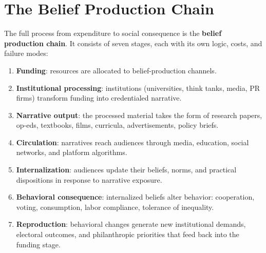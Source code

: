 \section{The Belief Production Chain}
\label{sec:ch1-chain}

The full process from expenditure to social consequence is the \textbf{belief production chain}.
It consists of seven stages, each with its own logic, costs, and failure modes:

\begin{enumerate}[nosep]
  \item \textbf{Funding}: resources are allocated to belief-production channels.
  \item \textbf{Institutional processing}: institutions (universities, think tanks, media, PR firms) transform funding into credentialed narrative.
  \item \textbf{Narrative output}: the processed material takes the form of research papers, op-eds, textbooks, films, curricula, advertisements, policy briefs.
  \item \textbf{Circulation}: narratives reach audiences through media, education, social networks, and platform algorithms.
  \item \textbf{Internalization}: audiences update their beliefs, norms, and practical dispositions in response to narrative exposure.
  \item \textbf{Behavioral consequence}: internalized beliefs alter behavior: cooperation, voting, consumption, labor compliance, tolerance of inequality.
  \item \textbf{Reproduction}: behavioral changes generate new institutional demands, electoral outcomes, and philanthropic priorities that feed back into the funding stage.
\end{enumerate}

\begin{center}
\end{center}

